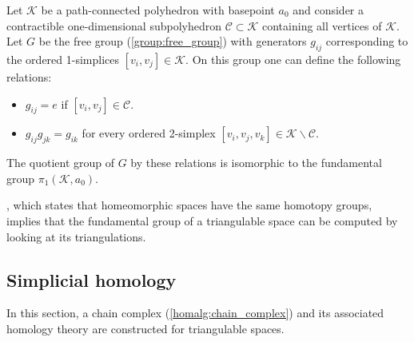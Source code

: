 

    \begin{property}
        Let $\mathcal{K}$ be a path-connected polyhedron with basepoint $a_0$ and consider a contractible one-dimensional subpolyhedron $\mathcal{C}\subset\mathcal{K}$ containing all vertices of $\mathcal{K}$. Let $G$ be the free group (\cref{group:free_group}) with generators $g_{ij}$ corresponding to the ordered 1-simplices $[v_i,v_j]\in\mathcal{K}$. On this group one can define the following relations:
        \begin{itemize}
            \item $g_{ij} = e$ if $[v_i,v_j]\in\mathcal{C}$.
            \item $g_{ij}g_{jk} = g_{ik}$ for every ordered 2-simplex $[v_i,v_j,v_k]\in\mathcal{K}\backslash\mathcal{C}$.
        \end{itemize}
        The quotient group of $G$ by these relations is isomorphic to the fundamental group $\pi_1(\mathcal{K},a_0)$.
    \end{property}
    \begin{result}
        , which states that homeomorphic spaces have the same homotopy groups, implies that the fundamental group of a triangulable space can be computed by looking at its triangulations.
    \end{result}

\subsection{Simplicial homology}

    In this section, a chain complex (\cref{homalg:chain_complex}) and its associated homology theory are constructed for triangulable spaces.

